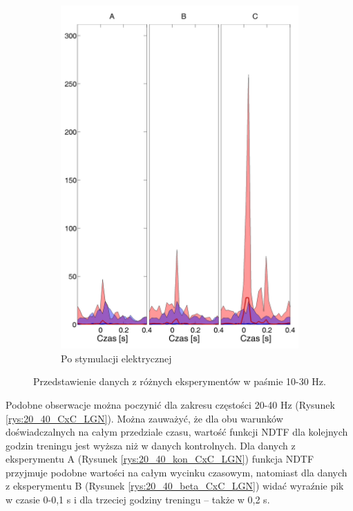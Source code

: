 \documentclass{pracamgr}
\begin{document}
\begin{figure}[h]
\begin{subfigure}{.5\textwidth}
			\centering
			\includegraphics[width=1.\linewidth]{beta3_10-30_z_CxC5_do_LGN42.png}
			\caption{Po stymulacji elektrycznej}
			\label{rys:10_30_beta_CxC_LGN}
		\end{subfigure}
		\caption{Przedstawienie danych z różnych eksperymentów w paśmie 10-30 Hz.}
		\label{rys:10_30_CxC_LGN}
	\end{figure}
	\FloatBarrier
	Podobne obserwacje można poczynić dla zakresu częstości 20-40 Hz (Rysunek \ref{rys:20_40_CxC_LGN}). Można zauważyć, że dla obu warunków doświadczalnych na całym przedziale czasu, wartość funkcji NDTF dla kolejnych godzin treningu jest wyższa niż w danych kontrolnych. Dla danych z eksperymentu A (Rysunek \ref{rys:20_40_kon_CxC_LGN}) funkcja NDTF przyjmuje podobne wartości na całym wycinku czasowym, natomiast dla danych z eksperymentu B (Rysunek \ref{rys:20_40_beta_CxC_LGN}) widać wyraźnie pik w czasie 0-0,1 s i dla trzeciej godziny treningu -- także w 0,2 s.
\end{document}
